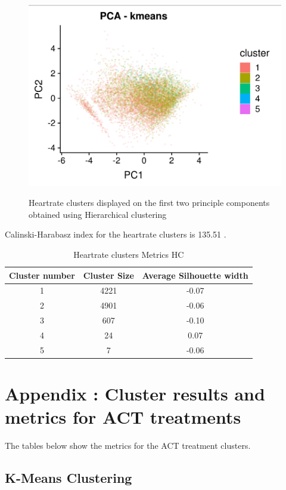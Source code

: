 \documentclass{article}
\begin{document}
\begin{figure}[htb]
  \centering
  \caption{Heartrate clusters displayed on the first two principle components obtained using Hierarchical clustering}
  \includegraphics[]{hr_HC_results.png}
  \label{fig:hrClustersHC}
\end{figure}

Calinski-Harabasz index for the heartrate clusters is 135.51 .

\begin{table}[H]
  \caption{Heartrate clusters Metrics HC}
  \label{hr_metrics}
  \centering
  \begin{tabular}{ |c|c|c|}
    \toprule
    \cmidrule(r){1-2}
    Cluster number & Cluster Size & Average Silhouette width \\
    \midrule
    1 & 4221 & -0.07 \\
    2 & 4901 & -0.06 \\
    3 & 607 & -0.10 \\
    4 & 24 & 0.07 \\
    5 & 7 & -0.06 \\
    \bottomrule
    \end{tabular}
\end{table}
\section{Appendix : Cluster results and metrics for ACT treatments}

The tables below show the metrics for the ACT treatment clusters.
\subsection{K-Means Clustering}
\end{document}
